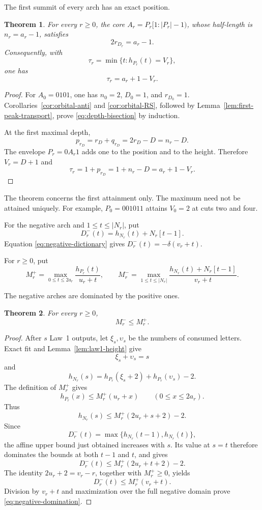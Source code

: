 \documentclass[11pt]{article}
\newtheorem{theorem}{Theorem}[section]
\theoremstyle{definition}
\theoremstyle{remark}
\begin{document}
The first summit of every arch has an exact position.
\begin{theorem}

For every \(r\geq0\), the core \(A_r=P_r[1:|P_r|-1)\), whose half-length is
\(n_r=a_r-1\), satisfies
\begin{equation}
\label{eq:depth-bisection}
 2r_{D_r}=a_r-1.
\end{equation}
Consequently, with
\[
 \tau_r=\min\{t:h_{P_r}(t)=V_r\},
\]
one has
\begin{equation*}
 \tau_r=a_r+1-V_r.
\end{equation*}
\end{theorem}

\begin{proof}
For \(A_0=0101\), one has \(n_0=2\), \(D_0=1\), and \(r_{D_0}=1\).
Corollaries~\ref{cor:orbital-anti} and \ref{cor:orbital-RS}, followed by
Lemma~\ref{lem:first-peak-transport}, prove \eqref{eq:depth-bisection} by
induction.

At the first maximal depth,
\[
 p_{r_D}=r_D+q_{r_D}=2r_D-D=n_r-D.
\]
The envelope \(P_r=0A_r1\) adds one to the position and to the height.
Therefore \(V_r=D+1\) and
\[
 \tau_r=1+p_{r_D}=1+n_r-D=a_r+1-V_r.
\]
\end{proof}

The theorem concerns the first attainment only.  The maximum need not be
attained uniquely.  For example, \(P_0=001011\) attains \(V_0=2\) at cuts two
and four.

For the negative arch and \(1\leq t\leq|N_r|\), put
\[
 D_r^-(t)=h_{N_r}(t)+N_r[t-1].
\]
Equation \eqref{eq:negative-dictionary} gives
\(D_r^-(t)=-\delta(v_r+t)\).

For \(r\geq0\), put
\[
 M_r^+=\max_{0\leq t\leq2a_r}\frac{h_{P_r}(t)}{u_r+t},
 \qquad
 M_r^-=\max_{1\leq t\leq|N_r|}
 \frac{h_{N_r}(t)+N_r[t-1]}{v_r+t}.
\]

The negative arches are dominated by the positive ones.
\begin{theorem}
\label{thm:negative-domination}
For every \(r\geq0\),
\begin{equation}
\label{eq:negative-domination}
 M_r^-\leq M_r^+.
\end{equation}
\end{theorem}

\begin{proof}
After \(s\) Law~1 outputs, let \(\xi_s,\upsilon_s\) be the numbers of consumed
letters.  Exact fit and Lemma~\ref{lem:law1-height} give
\[
 \xi_s+\upsilon_s=s
\]
and
\[
 h_{N_r}(s)=h_{P_r}(\xi_s+2)+h_{P_r}(\upsilon_s)-2.
\]
The definition of \(M_r^+\) gives
\[
 h_{P_r}(x)\leq M_r^+(u_r+x)
 \qquad(0\leq x\leq2a_r).
\]
Thus
\[
 h_{N_r}(s)\leq M_r^+(2u_r+s+2)-2.
\]
Since
\[
 D_r^-(t)=\max\{h_{N_r}(t-1),h_{N_r}(t)\},
\]
the affine upper bound just obtained increases with \(s\).  Its value at
\(s=t\) therefore dominates the bounds at both \(t-1\) and \(t\), and gives
\[
 D_r^-(t)\leq M_r^+(2u_r+t+2)-2.
\]
The identity \(2u_r+2=v_r-r\), together with \(M_r^+\geq0\), yields
\[
 D_r^-(t)\leq M_r^+(v_r+t).
\]
Division by \(v_r+t\) and maximization over the full negative domain prove
\eqref{eq:negative-domination}.
\end{proof}
\end{document}
